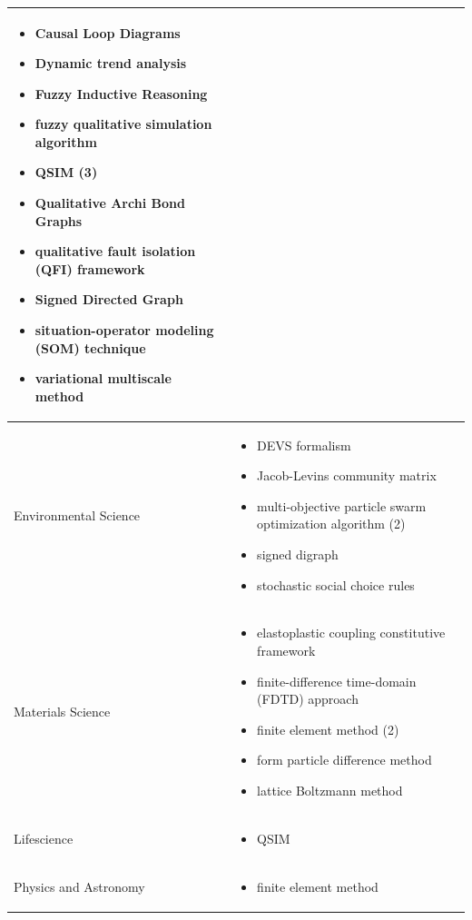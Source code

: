 \documentclass[utf8]{gradu3}
\begin{document}
\begin{longtable}[h]{|p{5cm}|p{8cm}|}
\begin{itemize}
        \item Causal Loop Diagrams
        \item Dynamic trend analysis
        \item Fuzzy Inductive Reasoning
        \item fuzzy qualitative simulation algorithm
        \item QSIM (3)
        \item Qualitative Archi Bond Graphs
        \item qualitative fault isolation (QFI) framework
        \item Signed Directed Graph
        \item situation-operator modeling (SOM) technique
        \item variational multiscale method
    \end{itemize} \\
    \hline
    Environmental Science & \begin{itemize}
        \item DEVS formalism
        \item Jacob-Levins community matrix
        \item multi-objective particle swarm optimization algorithm (2)
        \item signed digraph
        \item stochastic social choice rules
    \end{itemize} \\
    \hline
    Materials Science & \begin{itemize}
        \item elastoplastic coupling constitutive framework
        \item finite-difference time-domain (FDTD) approach
        \item finite element method (2)
        \item form particle difference method
        \item lattice Boltzmann method
    \end{itemize} \\
    \hline
    Lifescience & \begin{itemize}
        \item QSIM
    \end{itemize} \\
    \hline
    Physics and Astronomy & \begin{itemize}
        \item finite element method
    \end{itemize} \\

\end{longtable}
\end{document}
